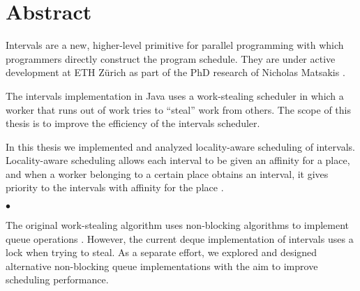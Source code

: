 
\chapter*{Abstract}
\label{chap:abstract}

Intervals \cite{Matsakis2009b} are a new, higher-level primitive for
parallel programming with which programmers directly construct the
program schedule. They are under active development at ETH Zürich as
part of the PhD research of Nicholas Matsakis \cite{Matsakis2010}.

The intervals implementation in Java uses a work-stealing scheduler in
which a worker that runs out of work tries to ``steal'' work from
others. The scope of this thesis is to improve the efficiency of the
intervals scheduler.

In this thesis we implemented and analyzed locality-aware scheduling of
intervals. Locality-aware scheduling allows each interval to be given
an affinity for a place, and when a worker belonging to a certain
place obtains an interval, it gives priority to the intervals with
affinity for the place \cite{Acar2002, Guo2010}.

\begin{center}
  $\bullet$
\end{center}

The original work-stealing algorithm uses non-blocking algorithms to
implement queue operations \cite{Arora2001}. However, the current
deque implementation of intervals uses a lock when trying to steal. As
a separate effort, we explored and designed alternative non-blocking
queue implementations with the aim to improve scheduling performance.





